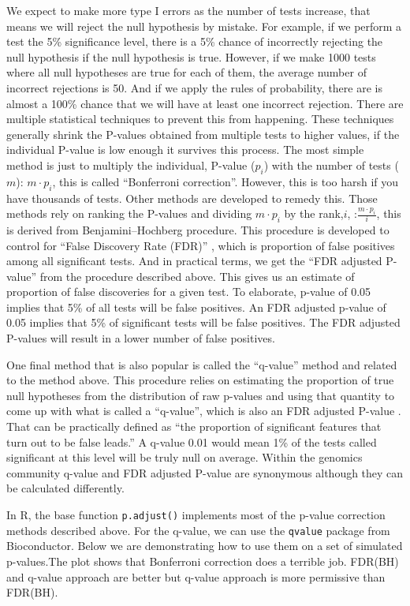 \documentclass[12pt,]{krantz}
\begin{document}
We expect to make more type I errors as the number of tests increase, that
means we will reject the null hypothesis by mistake. For example, if we
perform a test the 5\% significance level, there is a 5\% chance of
incorrectly rejecting the null hypothesis if the null hypothesis is true.
However, if we make 1000 tests where all null hypotheses are true for
each of them, the average number of incorrect rejections is 50. And if we
apply the rules of probability, there are is almost a 100\% chance that
we will have at least one incorrect rejection.
There are multiple statistical techniques to prevent this from happening.
These techniques generally shrink the P-values obtained from multiple
tests to higher values, if the individual P-value is low enough it survives
this process. The most simple method is just to multiply the individual,
P-value (\(p_i\)) with the number of tests (\(m\)): \(m \cdot p_i\), this is
called ``Bonferroni correction''. However, this is too harsh if you have thousands
of tests. Other methods are developed to remedy this. Those methods
rely on ranking the P-values and dividing \(m \cdot p_i\) by the
rank,\(i\), :\(\frac{m \cdot p_i }{i}\), this is derived from Benjamini--Hochberg
procedure. This procedure is developed to control for ``False Discovery Rate (FDR)''
, which is proportion of false positives among all significant tests. And in
practical terms, we get the ``FDR adjusted P-value'' from the procedure described
above. This gives us an estimate of proportion of false discoveries for a given
test. To elaborate, p-value of 0.05 implies that 5\% of all tests will be false positives. An FDR adjusted p-value of 0.05 implies that 5\% of significant tests will be false positives. The FDR adjusted P-values will result in a lower number of false positives.

One final method that is also popular is called the ``q-value''
method and related to the method above. This procedure relies on estimating the proportion of true null
hypotheses from the distribution of raw p-values and using that quantity
to come up with what is called a ``q-value'', which is also an FDR adjusted P-value . That can be practically defined
as ``the proportion of significant features that turn out to be false
leads.'' A q-value 0.01 would mean 1\% of the tests called significant at this
level will be truly null on average. Within the genomics community
q-value and FDR adjusted P-value are synonymous although they can be
calculated differently.

In R, the base function \texttt{p.adjust()} implements most of the p-value correction
methods described above. For the q-value, we can use the \texttt{qvalue} package from
Bioconductor. Below we are demonstrating how to use them on a set of simulated
p-values.The plot shows that Bonferroni correction does a terrible job. FDR(BH) and q-value
approach are better but q-value approach is more permissive than FDR(BH).
\end{document}
